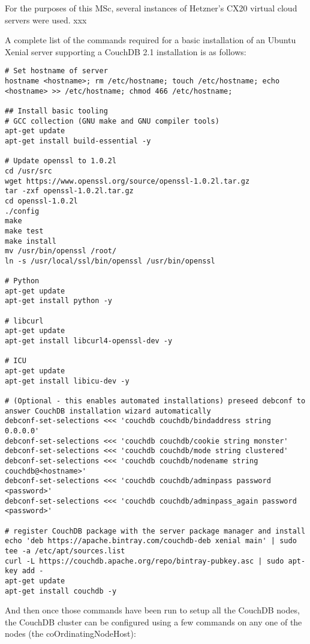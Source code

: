 For the purposes of this MSc, several instances of Hetzner's CX20 virtual cloud servers were used. xxx

A complete list of the commands required for a basic installation of an Ubuntu Xenial server supporting a CouchDB 2.1 installation is as follows:

\begin{verbatim}
# Set hostname of server
hostname <hostname>; rm /etc/hostname; touch /etc/hostname; echo <hostname> >> /etc/hostname; chmod 466 /etc/hostname;

## Install basic tooling 
# GCC collection (GNU make and GNU compiler tools)
apt-get update
apt-get install build-essential -y

# Update openssl to 1.0.2l
cd /usr/src
wget https://www.openssl.org/source/openssl-1.0.2l.tar.gz
tar -zxf openssl-1.0.2l.tar.gz
cd openssl-1.0.2l
./config
make
make test
make install
mv /usr/bin/openssl /root/
ln -s /usr/local/ssl/bin/openssl /usr/bin/openssl

# Python
apt-get update
apt-get install python -y

# libcurl
apt-get update
apt-get install libcurl4-openssl-dev -y

# ICU
apt-get update
apt-get install libicu-dev -y

# (Optional - this enables automated installations) preseed debconf to answer CouchDB installation wizard automatically
debconf-set-selections <<< 'couchdb couchdb/bindaddress string 0.0.0.0'
debconf-set-selections <<< 'couchdb couchdb/cookie string monster'
debconf-set-selections <<< 'couchdb couchdb/mode string clustered'
debconf-set-selections <<< 'couchdb couchdb/nodename string couchdb@<hostname>'
debconf-set-selections <<< 'couchdb couchdb/adminpass password <password>'
debconf-set-selections <<< 'couchdb couchdb/adminpass_again password <password>'

# register CouchDB package with the server package manager and install
echo 'deb https://apache.bintray.com/couchdb-deb xenial main' | sudo tee -a /etc/apt/sources.list
curl -L https://couchdb.apache.org/repo/bintray-pubkey.asc | sudo apt-key add -
apt-get update
apt-get install couchdb -y
\end{verbatim}

And then once those commands have been run to setup all the CouchDB nodes, the CouchDB cluster can be configured using a few commands on any one of the nodes (the coOrdinatingNodeHost):

